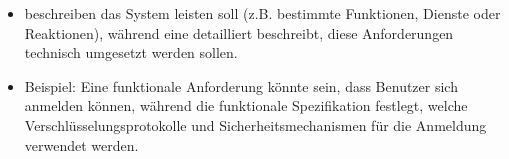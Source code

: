 \begin{infoBox}[title=Unterschied zu einer funktionalen Spezifikationen]
    \begin{itemize}
        \item {} beschreiben  das System leisten soll (z.B. bestimmte Funktionen, Dienste oder Reaktionen), während eine  detailliert beschreibt,  diese Anforderungen technisch umgesetzt werden sollen.
        \item Beispiel: Eine funktionale Anforderung könnte sein, dass Benutzer sich anmelden können, während die funktionale Spezifikation festlegt, welche Verschlüsselungsprotokolle und Sicherheitsmechanismen für die Anmeldung verwendet werden.
    \end{itemize}
\end{infoBox}
